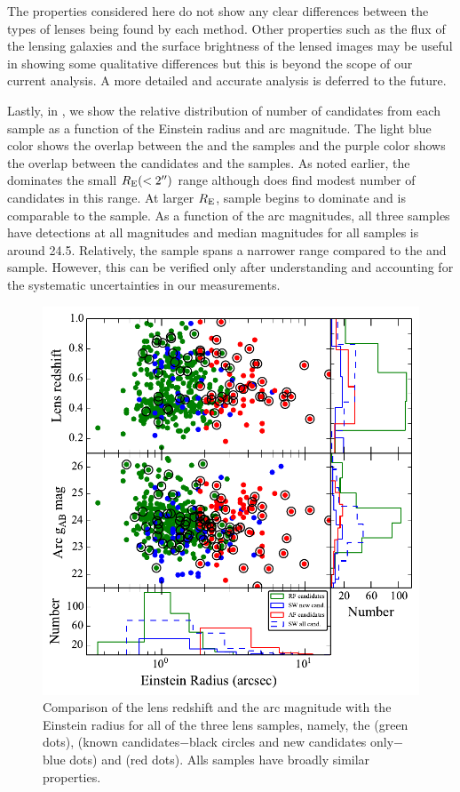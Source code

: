 \documentclass[useAMS,usenatbib,a4paper]{mn2e}
\begin{document}
The properties considered here do not show any clear differences between
the types of lenses being found by each method. Other properties such as
the flux of the lensing galaxies and the surface brightness of the
lensed images may be useful in showing some qualitative differences but
this is beyond the scope of our current analysis. A more detailed and
accurate analysis is deferred to the future.

Lastly, in , we show the relative distribution of
number of candidates from each sample as a function of the Einstein
radius and arc magnitude. The light blue color shows the overlap between
the \sw and the \rf samples and the purple color shows the overlap
between the \sw candidates and the \af samples. As noted earlier, the
\rf dominates the small $R_{\rm E} (<2\hbox{$^{\prime\prime}$})$ range although \sw does
find modest number of candidates in this range. At larger $R_{\rm E}$,
\sw sample begins to dominate and is comparable to the \af sample.  As a
function of the arc magnitudes, all three samples have detections at all
magnitudes and median magnitudes for all samples is around 24.5.
Relatively, the \rf sample spans a narrower range compared to the \sw
and \af sample. However, this can be verified only after understanding
and accounting for the systematic uncertainties in our measurements.

\begin{figure}
\begin{center}
\includegraphics[scale=0.65]{sw-cfhtls-figs/zl_mg_re.pdf}
\caption{ \label{fig:zlmgre}
Comparison of the lens redshift and the arc magnitude with the
Einstein radius for all of the three lens samples, namely, the \rf (green dots),
\sw (known candidates$-$black circles and new candidates only$-$blue dots)
and \af (red dots). Alls samples have broadly similar properties.}
\end{center}
\end{figure}
\end{document}
